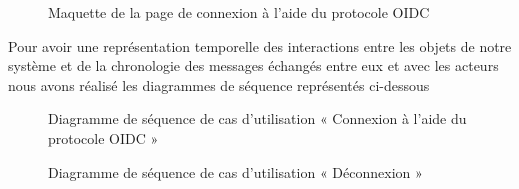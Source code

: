 \begin{figure}[H]
  \centering
  \caption{Maquette de la page de connexion à l'aide du protocole OIDC}
  \label{fig:design_OIDC}
\end{figure}


Pour avoir une représentation temporelle des interactions entre les objets de notre système et de la chronologie des messages échangés entre eux et avec les acteurs nous avons réalisé les diagrammes de séquence représentés ci-dessous

\begin{figure}[H]
  \centering
  \caption{Diagramme de séquence de cas d'utilisation « Connexion à l'aide du protocole OIDC »}
  \label{fig:sequence_auth_OIDC}
\end{figure}

\begin{figure}[H]
  \centering
  \caption{Diagramme de séquence de cas d'utilisation « Déconnexion »}
  \label{fig:sequence_logout_OIDC}
\end{figure}


